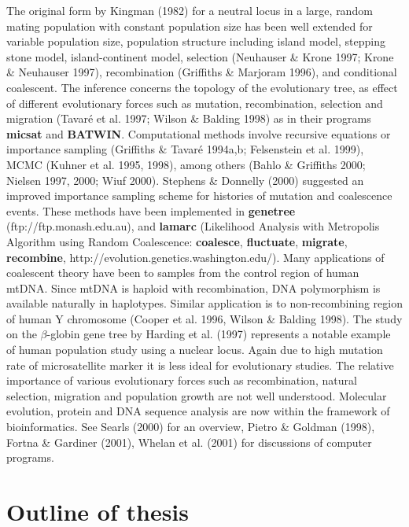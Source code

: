 The original form by Kingman (1982) for a neutral locus in a large, random
mating population with constant population size has been well extended for
variable population size, population structure including island model, stepping
stone model, island-continent model, selection (Neuhauser \& Krone 1997; Krone
\& Neuhauser 1997), recombination (Griffiths \& Marjoram 1996), and conditional
coalescent.  The inference concerns the topology of the evolutionary tree, as
effect of different evolutionary forces such as mutation, recombination,
selection and migration (Tavar\'{e} et al.  1997; Wilson \& Balding 1998) as in
their programs {\bf micsat} and {\bf BATWIN}.  Computational methods involve
recursive equations or importance sampling (Griffiths \& Tavar\'{e} 1994a,b;
Felsenstein et al.  1999), MCMC (Kuhner et al.  1995, 1998), among others
(Bahlo \& Griffiths 2000; Nielsen 1997, 2000; Wiuf 2000).  Stephens \& Donnelly
(2000) suggested an improved importance sampling scheme for histories of
mutation and coalescence events.  These methods have been implemented in {\bf
genetree} (ftp://ftp.monash.edu.au), and {\bf lamarc} (Likelihood Analysis with
Metropolis Algorithm using Random Coalescence:  {\bf coalesce}, {\bf
fluctuate}, {\bf migrate}, {\bf recombine},
http://evolution.genetics.washington.edu/).  Many applications of coalescent
theory have been to samples from the control region of human mtDNA.  Since
mtDNA is haploid with recombination, DNA polymorphism is available naturally in
haplotypes.  Similar application is to non-recombining region of human Y
chromosome (Cooper et al.  1996, Wilson \& Balding 1998).  The study on the
$\beta$-globin gene tree by Harding et al.  (1997) represents a notable example
of human population study using a nuclear locus.  Again due to high mutation
rate of microsatellite marker it is less ideal for evolutionary studies.  The
relative importance of various evolutionary forces such as recombination,
natural selection, migration and population growth are not well understood.
Molecular evolution, protein and {DNA} sequence analysis are now within the
framework of bioinformatics.  See Searls (2000) for an overview, Pietro \&
Goldman (1998), Fortna \& Gardiner (2001), Whelan et al.  (2001) for
discussions of computer programs.


\section{Outline of thesis}

